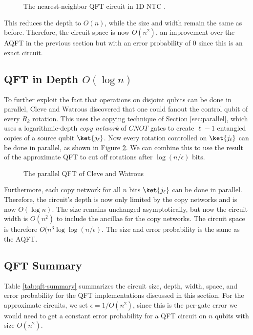 \begin{figure}
\label{fig:qft-fdh}
\caption{The nearest-neighbor QFT circuit in 1D NTC \cite{Fowler2004}.}
\end{figure}

This reduces the depth to $O(n)$, while the size and width remain the same
as before. Therefore, the circuit space is now $O(n^2)$, an improvement over
the AQFT in the previous section but with an error probability of $0$ since
this is an exact circuit.

\subsection{QFT in Depth $O(\log n)$}
\label{subsec:qft-log}

To further exploit the fact that operations on disjoint qubits can be done
in parallel, Cleve and Watrous discovered that one could fanout the control
qubit of every $R_k$ rotation. This uses the copying technique of
Section \ref{sec:parallel}, which uses a logarithmic-depth \emph{copy network}
of
$CNOT$ gates to create $\ell-1$ entangled copies of a source qubit
$\ket{j_\ell}$. Now every rotation controlled on $\ket{j_\ell}$ can be done
in parallel, as shown in Figure \ref{fig:qft-cw}. We can combine
this to use the
result of the approximate QFT to cut off rotations after $\log(n/\epsilon)$
bits.

\begin{figure}
\label{fig:qft-cw}
\caption{The parallel QFT of Cleve and Watrous}
\end{figure}

Furthermore, each copy network for all $n$ bits $\ket{j_\ell}$ can be done
in parallel.
Therefore, the circuit's depth is now only limited by the copy networks
and is now $O(\log n)$. The size remains unchanged asymptotically, but now
the circuit width is $O(n^2)$ to include the ancillae for the copy networks.
The circuit space is therefore $O(n^3\log\log(n/\epsilon)$. The size and
error probability is
the same as the AQFT.

\subsection{QFT Summary}

Table \ref{tab:qft-summary} summarizes the circuit size, depth, width, space, and
error probability for the QFT implementations discussed in this section.
For the approximate circuits, we set $\epsilon = 1/O(n^2)$,
since this is the per-gate error we would need to get a constant
error probability for a QFT circuit on $n$ qubits with size $O(n^2)$.

